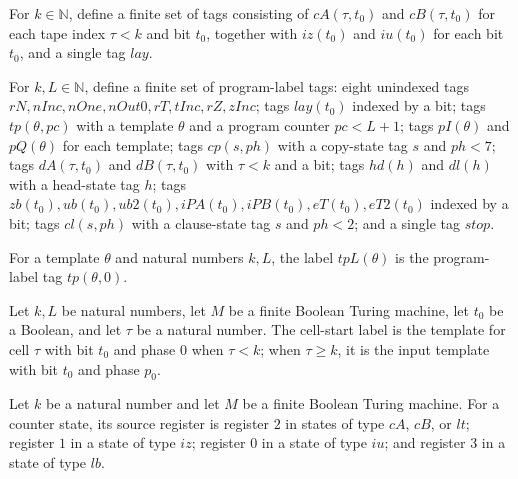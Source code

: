 \begin{definition}
\label{Complexity.UTab.Hd}
\leanok
For $k\in\mathbb N$, define a finite set of tags consisting of $cA(\tau,t_0)$ and
$cB(\tau,t_0)$ for each tape index $\tau<k$ and bit $t_0$, together with $iz(t_0)$ and
$iu(t_0)$ for each bit $t_0$, and a single tag $lay$.
\end{definition}

\begin{definition}
\label{Complexity.UTab.Lb}
\leanok
{}
For $k,L\in\mathbb N$, define a finite set of program-label tags: eight unindexed tags
$rN,nInc,nOne,nOut0,rT,tInc,rZ,zInc$; tags $lay(t_0)$ indexed by a bit; tags
$tp(\theta,pc)$ with a template $\theta$ and a program counter $pc<L+1$; tags
$pI(\theta)$ and $pQ(\theta)$ for each template; tags $cp(s,ph)$ with a copy-state tag
$s$ and $ph<7$; tags $dA(\tau,t_0)$ and $dB(\tau,t_0)$ with $\tau<k$ and a bit; tags
$hd(h)$ and $dl(h)$ with a head-state tag $h$; tags
$zb(t_0),ub(t_0),ub2(t_0),iPA(t_0),iPB(t_0),eT(t_0),eT2(t_0)$ indexed by a bit; tags
$cl(s,ph)$ with a clause-state tag $s$ and $ph<2$; and a single tag $stop$.
\end{definition}

\begin{definition}
\label{Complexity.UTab.tpL}
\leanok
{}
For a template $\theta$ and natural numbers $k,L$, the label $tpL(\theta)$ is the
program-label tag $tp(\theta,0)$.
\end{definition}

\begin{definition}
\label{Complexity.UTab.cellStart}
\leanok
{}
Let $k,L$ be natural numbers, let $M$ be a finite Boolean Turing machine, let $t_0$ be a
Boolean, and let $\tau$ be a natural number. The cell-start label is the template for
cell $\tau$ with bit $t_0$ and phase $0$ when $\tau<k$; when $\tau\ge k$, it is the
input template with bit $t_0$ and phase $p_0$.
\end{definition}

\begin{definition}
\label{Complexity.UTab.CpS.src}
\leanok
{}
Let $k$ be a natural number and let $M$ be a finite Boolean Turing machine. For a
counter state, its source register is register $2$ in states of type $cA$, $cB$, or
$lt$; register $1$ in a state of type $iz$; register $0$ in a state of type $iu$; and
register $3$ in a state of type $lb$.
\end{definition}

